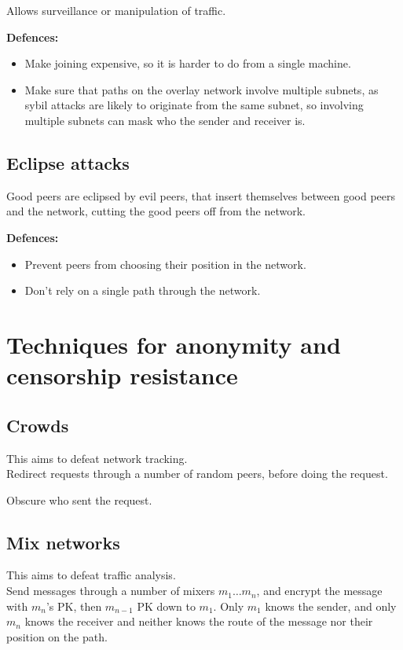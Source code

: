 	Allows surveillance or manipulation of traffic.
	
	\textbf{Defences:}
	\begin{itemize}
		\item Make joining expensive, so it is harder to do from a single machine.
		\item Make sure that paths on the overlay network involve multiple subnets, as sybil attacks are likely to originate from the same subnet, so involving multiple subnets can mask who the sender and receiver is.
	\end{itemize}
	
	\subsection{Eclipse attacks}
	Good peers are eclipsed by evil peers, that insert themselves between good peers and the network, cutting the good peers off from the network.
	
	\textbf{Defences:}
	\begin{itemize}
		\item Prevent peers from choosing their position in the network.
		\item Don't rely on a single path through the network.
	\end{itemize}
	
	\section{Techniques for anonymity and censorship resistance}
	
	\subsection{Crowds}
	This aims to defeat network tracking.\\
	Redirect requests through a number of random peers, before doing the request.
	
	Obscure who sent the request.
	
	\subsection{Mix networks}
	This aims to defeat traffic analysis.\\
	Send messages through a number of mixers $m_1 \dots m_n$, and encrypt the message with $m_n$'s \gls{PK}, then $m_{n-1}$ \gls{PK} down to $m_1$.
	Only $m_1$ knows the sender, and only $m_n$ knows the receiver and neither knows the route of the message nor their position on the path.
	
